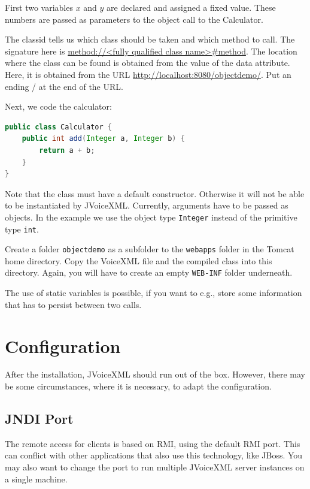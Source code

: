 \documentclass[11pt,a4paper]{article}
\begin{document}
First two variables $x$ and $y$ are declared and assigned a fixed value. These
numbers are passed as parameters to the object call to the Calculator.

The classid tells us which class should be taken and which method to call. The
signature here is \url{method://<fully qualified class name>#method}.
The location where the class can be found is obtained from the value of the data
attribute. Here, it is obtained from the URL
\url{http://localhost:8080/objectdemo/}. Put an ending / at the end
of the URL.

Next, we code the calculator:
\begin{lstlisting}[language=Java]
public class Calculator {
    public int add(Integer a, Integer b) {
        return a + b;
    }
}
\end{lstlisting}

Note that the class must have a default constructor. Otherwise it will not be
able to be instantiated by JVoiceXML. Currently, arguments have to be passed as
objects. In the example we use the object type \lstinline{Integer} instead of
the primitive type \lstinline{int}.

Create a folder \lstinline{objectdemo} as a subfolder to the \lstinline{webapps}
folder in the Tomcat home directory. Copy the VoiceXML file and the compiled
class into this directory. Again, you will have to create an empty
\lstinline{WEB-INF} folder underneath.

The use of static variables is possible, if you want
to e.g., store some information that has to persist between two calls.

\section{Configuration}
\label{sec:configuration}

After the installation, JVoiceXML should run out of the box. However, there may 
be some circumstances, where it is necessary, to adapt the configuration.

\subsection{JNDI Port}
\label{sec:jndi-port}

The remote access for clients is based on RMI, using the default RMI port. This
can conflict with other applications that also use this technology, like JBoss.
You may also want to change the port to run multiple JVoiceXML server instances
on a single machine.
\end{document}
